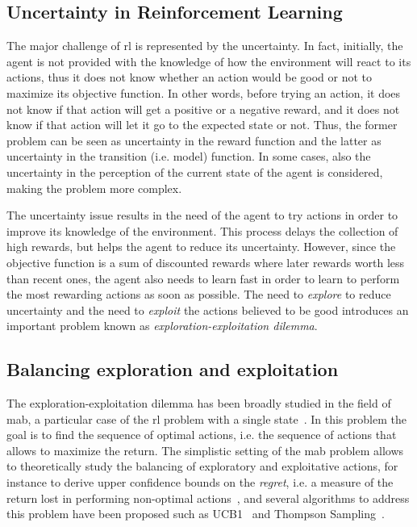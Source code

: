 \subsection{Uncertainty in Reinforcement Learning}
The major challenge of \gls{rl} is represented by the uncertainty. In fact, initially, the agent is not provided with the knowledge of how the environment will react to its actions, thus it does not know whether an action would be good or not to maximize its objective function. In other words, before trying an action, it does not know if that action will get a positive or a negative reward, and it does not know if that action will let it go to the expected state or not. Thus, the former problem can be seen as uncertainty in the reward function and the latter as uncertainty in the transition (i.e. model) function. In some cases, also the uncertainty in the perception of the current state of the agent is considered, making the problem more complex.

The uncertainty issue results in the need of the agent to try actions in order to improve its knowledge of the environment. This process delays the collection of high rewards, but helps the agent to reduce its uncertainty. However, since the objective function is a sum of discounted rewards where later rewards worth less than recent ones, the agent also needs to learn fast in order to learn to perform the most rewarding actions as soon as possible. The need to \textit{explore} to reduce uncertainty and the need to \textit{exploit} the actions believed to be good introduces an important problem known as \textit{exploration-exploitation dilemma}.

\subsection{Balancing exploration and exploitation}
The exploration-exploitation dilemma has been broadly studied in the field of \gls{mab}, a particular case of the \gls{rl} problem with a single state~\cite{lai1985asymptotically}. In this problem the goal is to find the sequence of optimal actions, i.e. the sequence of actions that allows to maximize the return. The simplistic setting of the \gls{mab} problem allows to theoretically study the balancing of exploratory and exploitative actions, for instance to derive upper confidence bounds on the \textit{regret}, i.e. a measure of the return lost in performing non-optimal actions~\cite{bubeck2012regret, agrawal2012analysis, vermorel2005multi}, and several algorithms to address this problem have been proposed such as UCB1~\cite{auer2002finite} and Thompson Sampling~\cite{thompson1933likelihood}.

